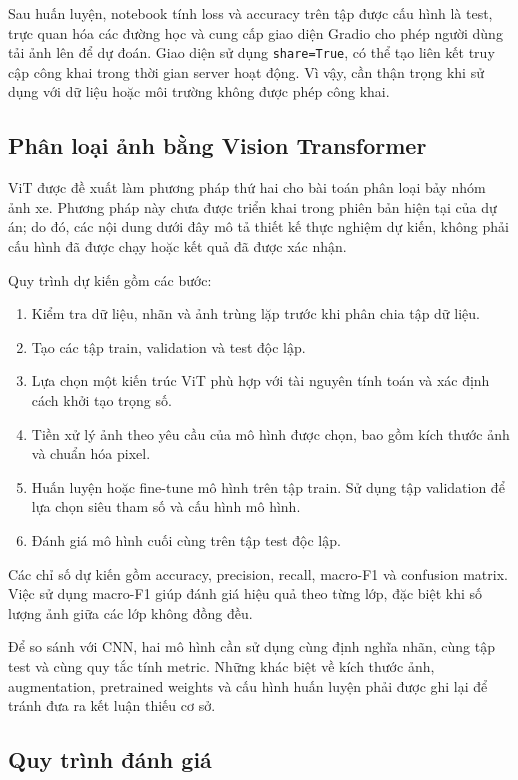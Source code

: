 \documentclass[runningheads]{llncs}
\begin{document}
Sau huấn luyện, notebook tính loss và accuracy trên tập
được cấu hình là test, trực quan hóa các đường học và
cung cấp giao diện Gradio cho phép người dùng tải ảnh
lên để dự đoán. Giao diện sử dụng \texttt{share=True},
có thể tạo liên kết truy cập công khai trong thời gian
server hoạt động. Vì vậy, cần thận trọng khi sử dụng
với dữ liệu hoặc môi trường không được phép công khai.

\subsection{Phân loại ảnh bằng Vision Transformer}

ViT được đề xuất làm phương pháp thứ hai cho bài toán
phân loại bảy nhóm ảnh xe. Phương pháp này chưa được
triển khai trong phiên bản hiện tại của dự án; do đó,
các nội dung dưới đây mô tả thiết kế thực nghiệm dự kiến,
không phải cấu hình đã được chạy hoặc kết quả đã được
xác nhận.

Quy trình dự kiến gồm các bước:

\begin{enumerate}
    \item Kiểm tra dữ liệu, nhãn và ảnh trùng lặp trước
          khi phân chia tập dữ liệu.
    \item Tạo các tập train, validation và test độc lập.
    \item Lựa chọn một kiến trúc ViT phù hợp với tài
          nguyên tính toán và xác định cách khởi tạo trọng số.
    \item Tiền xử lý ảnh theo yêu cầu của mô hình được
          chọn, bao gồm kích thước ảnh và chuẩn hóa pixel.
    \item Huấn luyện hoặc fine-tune mô hình trên tập train.
          Sử dụng tập validation để lựa chọn siêu tham số và
          cấu hình mô hình.
    \item Đánh giá mô hình cuối cùng trên tập test độc lập.
\end{enumerate}

Các chỉ số dự kiến gồm accuracy, precision, recall,
macro-F1 và confusion matrix. Việc sử dụng macro-F1
giúp đánh giá hiệu quả theo từng lớp, đặc biệt khi số
lượng ảnh giữa các lớp không đồng đều.

Để so sánh với CNN, hai mô hình cần sử dụng cùng định
nghĩa nhãn, cùng tập test và cùng quy tắc tính metric.
Những khác biệt về kích thước ảnh, augmentation, pretrained
weights và cấu hình huấn luyện phải được ghi lại để
tránh đưa ra kết luận thiếu cơ sở.

\subsection{Quy trình đánh giá}
\end{document}
